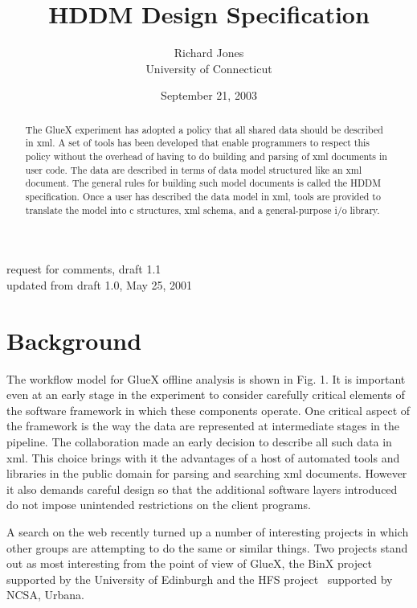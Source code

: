 \documentclass[10pt]{article}
\begin{document}
\title{HDDM Design Specification}
\author{Richard Jones\\
University of Connecticut}
\date{September 21, 2003}
\maketitle
\vspace{2cm}
\begin{center}
request for comments, draft 1.1\\
updated from draft 1.0, May 25, 2001
\end{center}

\vspace{2cm}
\begin{abstract}
The GlueX experiment has adopted a policy that all shared data should
be described in xml.  A set of tools has been developed that enable
programmers to respect this policy without the overhead of having
to do building and parsing of xml documents in user code.  The data
are described in terms of data model structured like an xml document.
The general rules for building such model documents is called the
HDDM specification.  Once a user has described the data model in xml,
tools are provided to translate the model into c structures, xml
schema, and a general-purpose i/o library.
\end{abstract}

\newpage

\section{Background}
The workflow model for GlueX offline analysis is shown in Fig. 1.
It is important even at an early stage in the experiment to consider
carefully critical elements of the software framework in which these
components operate.  One critical aspect of the framework is the way
the data are represented at intermediate stages in the pipeline.  The
collaboration made an early decision to describe all such data in xml.
This choice brings with it the advantages of a host of automated tools
and libraries in the public domain for parsing and searching xml documents.
However it also demands careful design so that the additional software
layers introduced do not impose unintended restrictions on the client
programs.

A search on the web recently turned up a number of interesting projects
in which other groups are attempting to do the same or similar things.
Two projects stand out as most interesting from the point of view of
GlueX, the BinX project~\cite{binx} supported by the University of
Edinburgh and the HFS project~\cite{hdf} supported by NCSA, Urbana.
\end{document}
